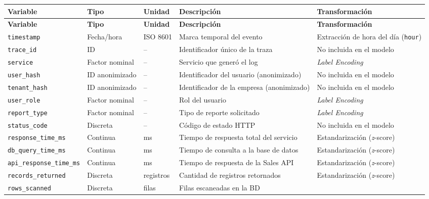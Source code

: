 \documentclass[12pt,letterpaper, oneside]{book}
\begin{document}
    \begin{longtable}{p{3.8cm}p{1.8cm}p{1.5cm}p{4.2cm}p{2.5cm}}
    \toprule
    \textbf{Variable} & \textbf{Tipo} & \textbf{Unidad} &
    \textbf{Descripción} & \textbf{Transformación} \\
    \midrule
    \endfirsthead
    \toprule
    \textbf{Variable} & \textbf{Tipo} & \textbf{Unidad} &
    \textbf{Descripción} & \textbf{Transformación} \\
    \midrule
    \endhead
    \texttt{timestamp} & Fecha/hora & ISO 8601 &
        Marca temporal del evento &
        Extracción de hora del día (\texttt{hour}) \\
    \texttt{trace\_id} & ID & -- &
        Identificador único de la traza &
        No incluida en el modelo \\
    \texttt{service} & Factor nominal & -- &
        Servicio que generó el log &
        \textit{Label Encoding} \\
    \texttt{user\_hash} & ID anonimizado & -- &
        Identificador del usuario (anonimizado) &
        No incluida en el modelo \\
    \texttt{tenant\_hash} & ID anonimizado & -- &
        Identificador de la empresa (anonimizado) &
        No incluida en el modelo \\
    \texttt{user\_role} & Factor nominal & -- &
        Rol del usuario &
        \textit{Label Encoding} \\
    \texttt{report\_type} & Factor nominal & -- &
        Tipo de reporte solicitado &
        \textit{Label Encoding} \\
    \texttt{status\_code} & Discreta & -- &
        Código de estado HTTP &
        No incluida en el modelo \\
    \texttt{response\_time\_ms} & Continua & ms &
        Tiempo de respuesta total del servicio &
        Estandarización (\textit{z}-score) \\
    \texttt{db\_query\_time\_ms} & Continua & ms &
        Tiempo de consulta a la base de datos &
        Estandarización (\textit{z}-score) \\
    \texttt{api\_response\_time\_ms} & Continua & ms &
        Tiempo de respuesta de la Sales API &
        Estandarización (\textit{z}-score) \\
    \texttt{records\_returned} & Discreta & registros &
        Cantidad de registros retornados &
        Estandarización (\textit{z}-score) \\
    \texttt{rows\_scanned} & Discreta & filas &
        Filas escaneadas en la BD &

\end{longtable}
\end{document}

